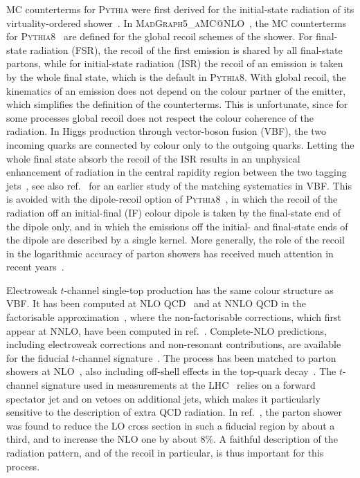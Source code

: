 \documentclass[a4paper,11pt]{article}
\makeatletter
\newcommand{\mgamc}{\textsc{MadGraph5\_aMC@NLO}\xspace}
\newcommand{\pythia}{\textsc{Pythia8}\xspace}
\makeatother
\begin{document}
MC counterterms for \textsc{Pythia} were first derived for the
initial-state radiation of its virtuality-ordered
shower~\cite{Torrielli:2010aw}. In
\mgamc~\cite{Alwall:2014hca,Frederix:2018nkq}, the MC counterterms
for \pythia~\cite{Sjostrand:2004ef,Bierlich:2022pfr} are defined for
the global recoil schemes of the shower. For final-state radiation
(FSR), the recoil of the first emission is shared by all final-state
partons, while for initial-state radiation (ISR) the recoil of an
emission is taken by the whole final state, which is the default in
\pythia. With global recoil, the kinematics of an emission does not
depend on the colour partner of the emitter, which simplifies the
definition of the counterterms. This is unfortunate, since for some
processes global recoil does not respect the colour coherence of the
radiation. In Higgs production through vector-boson fusion (VBF), the
two incoming quarks are connected by colour only to the outgoing
quarks. Letting the whole final state absorb the recoil of the ISR
results in an unphysical enhancement of radiation in the central
rapidity region between the two tagging
jets~\cite{Jager:2020hkz,Hoche:2021mkv}, see also
ref.~\cite{Frixione:2013mta} for an earlier study of the matching
systematics in VBF. This is avoided
with the dipole-recoil option of
\pythia~\cite{Cabouat:2017rzi}, in which the recoil of the
radiation off an initial-final (IF) colour dipole is taken by the
final-state end of the dipole only, and in which the emissions off
the initial- and final-state ends of the dipole are described by a
single kernel. More generally, the role of the recoil in the
logarithmic accuracy of parton showers has received much attention in
recent
years~\cite{Dasgupta:2018nvj,Bewick:2019rbu,Dasgupta:2020fwr,Forshaw:2020wrq,vanBeekveld:2022zhl,Herren:2022jej}.

Electroweak $t$-channel single-top production has the same colour
structure as VBF. It has been computed at NLO
QCD~\cite{Stelzer:1997ns,Harris:2002md,Campbell:2004ch,Campbell:2009ss}
and at NNLO QCD in the factorisable
approximation~\cite{Brucherseifer:2014ama,Berger:2016oht,Campbell:2020fhf},
where the non-factorisable corrections, which first appear at NNLO,
have been computed in ref.~\cite{Bronnum-Hansen:2022tmr}. Complete-NLO
predictions, including electroweak corrections and non-resonant
contributions, are available for the fiducial $t$-channel
signature~\cite{Frederix:2019ubd}. The process has been matched to
parton showers at
NLO~\cite{Frixione:2005vw,Alioli:2009je,Frederix:2012dh}, also
including off-shell effects in the top-quark
decay~\cite{Frederix:2016rdc,vanBeekveld:2026mjv}. The
$t$-channel signature used in measurements at the
LHC~\cite{CMS:2018lgn,CMS:2019jjp,ATLAS:2024ojr} relies on a forward
spectator jet and on vetoes on additional jets, which makes it
particularly sensitive to the description of extra QCD radiation. In
ref.~\cite{Frederix:2019ubd}, the parton shower was found to reduce
the LO cross section in such a fiducial region by about a third, and
to increase the NLO one by about $8\%$. A faithful description of the
radiation pattern, and of the recoil in particular, is thus important
for this process.
\end{document}
